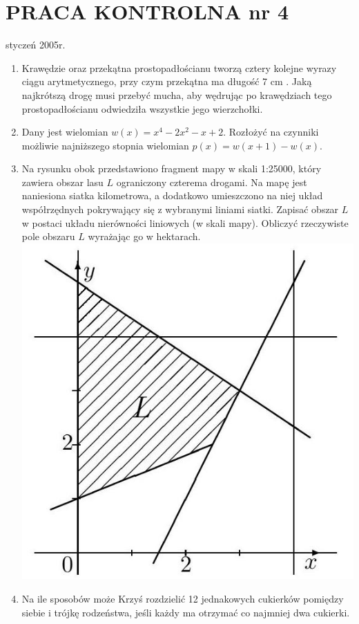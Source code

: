 \documentclass[10pt]{article}
\begin{document}
\section*{PRACA KONTROLNA nr 4}
styczeń 2005r.

\begin{enumerate}
  \item Krawędzie oraz przekątna prostopadłościanu tworzą cztery kolejne wyrazy ciągu arytmetycznego, przy czym przekątna ma długość 7 cm . Jaką najkrótszą drogę musi przebyć mucha, aby wędrując po krawędziach tego prostopadłościanu odwiedziła wszystkie jego wierzchołki.
  \item Dany jest wielomian $w(x)=x^{4}-2 x^{2}-x+2$. Rozłożyć na czynniki możliwie najniższego stopnia wielomian $p(x)=w(x+1)-w(x)$.
  \item Na rysunku obok przedstawiono fragment mapy w skali 1:25000, który zawiera obszar lasu $L$ ograniczony czterema drogami. Na mapę jest naniesiona siatka kilometrowa, a dodatkowo umieszczono na niej układ współrzędnych pokrywający się z wybranymi liniami siatki. Zapisać obszar $L$ w postaci układu nierówności liniowych (w skali mapy). Obliczyć rzeczywiste pole obszaru $L$ wyrażając go w hektarach.\\
\includegraphics[max width=\textwidth, center]{2024_11_16_8518088a6e381b1443b2g-4}
  \item Na ile sposobów może Krzyś rozdzielić 12 jednakowych cukierków pomiędzy siebie i trójkę rodzeństwa, jeśli każdy ma otrzymać co najmniej dwa cukierki.

\end{enumerate}
\end{document}

